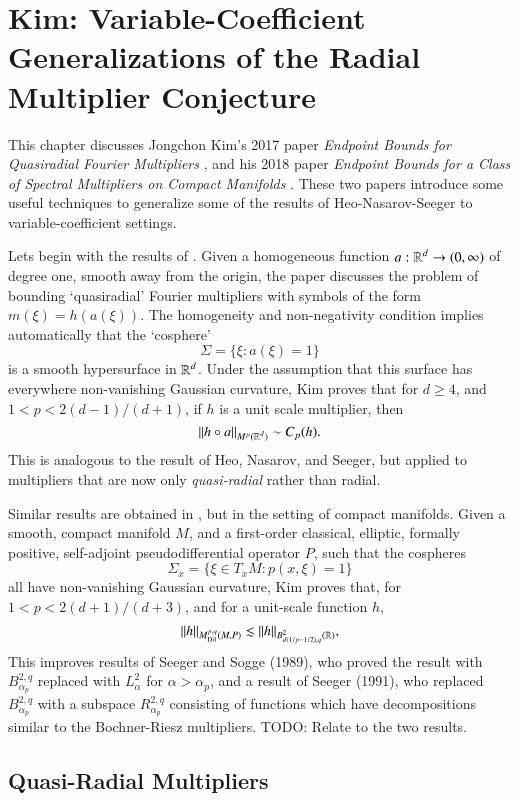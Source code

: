 \chapter[Kim: Variable Coefficient Generalizations of the RMC]{Kim: Variable-Coefficient Generalizations of the Radial Multiplier Conjecture}

This chapter discusses Jongchon Kim's 2017 paper \emph{Endpoint Bounds for Quasiradial Fourier Multipliers} \cite{KimQuasiradial}, and his 2018 paper \emph{Endpoint Bounds for a Class of Spectral Multipliers on Compact Manifolds} \cite{KimSpectral}. These two papers introduce some useful techniques to generalize some of the results of Heo-Nasarov-Seeger to variable-coefficient settings.

Lets begin with the results of \cite{KimQuasiradial}. Given a homogeneous function $a: \operatorname{\mathbb{R}}^d \to (0,\infty)$ of degree one, smooth away from the origin, the paper discusses the problem of bounding `quasiradial' Fourier multipliers with symbols of the form $m(\xi) = h(a(\xi))$. The homogeneity and non-negativity condition implies automatically that the `cosphere'
%
\[ \Sigma = \{ \xi : a(\xi) = 1 \} \]
%
is a smooth hypersurface in $\operatorname{\mathbb{R}}^d$. Under the assumption that this surface has everywhere non-vanishing Gaussian curvature, Kim proves that for $d \geq 4$, and $1 < p < 2(d-1)/(d+1)$, if $h$ is a unit scale multiplier, then
%
\[ \| h \circ a \|_{M^p(\operatorname{\mathbb{R}}^d)} \sim C_p(h). \]
%
This is analogous to the result of Heo, Nasarov, and Seeger, but applied to multipliers that are now only \emph{quasi-radial} rather than radial.

Similar results are obtained in \cite{KimSpectral}, but in the setting of compact manifolds. Given a smooth, compact manifold $M$, and a first-order classical, elliptic, formally positive, self-adjoint pseudodifferential operator $P$, such that the cospheres
%
\[ \Sigma_x = \{ \xi \in T_x M : p(x,\xi) = 1 \} \]
%
all have non-vanishing Gaussian curvature, Kim proves that, for $1 < p < 2(d+1)/(d+3)$, and for a unit-scale function $h$,
%
\[ \| h \|_{M^{p,q}_{\text{Dil}}(M,P)} \lesssim \| h \|_{B^2_{d(1/p - 1/2),q}(\operatorname{\mathbb{R}})}, \]
%
This improves results of Seeger and Sogge (1989), who proved the result with $B^{2,q}_{\alpha_p}$ replaced with $L^2_\alpha$ for $\alpha > \alpha_p$, and a result of Seeger (1991), who replaced $B^{2,q}_{\alpha_p}$ with a subspace $R^{2,q}_{\alpha_p}$ consisting of functions which have decompositions similar to the Bochner-Riesz multipliers. TODO: Relate to the two results.

\section{Quasi-Radial Multipliers}

